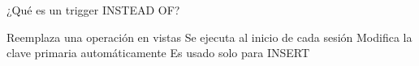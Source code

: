 \question[1] ¿Qué es un trigger INSTEAD OF?
\begin{choices}
\CorrectChoice Reemplaza una operación en vistas
\choice Se ejecuta al inicio de cada sesión
\choice Modifica la clave primaria automáticamente
\choice Es usado solo para INSERT
\end{choices}
